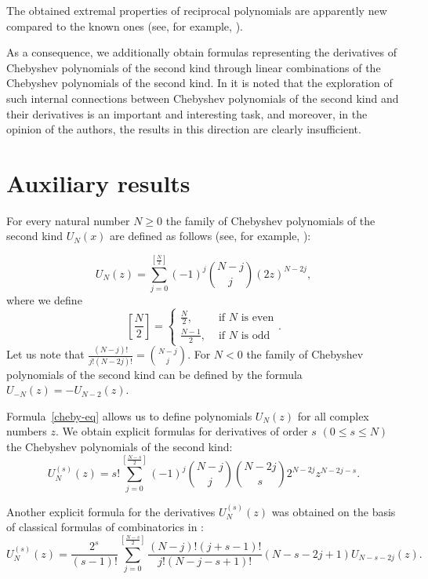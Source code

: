 \documentclass[12pt]{article}
\newcommand{\pa}[1]{\left(#1\right)}
\newcommand{\br}[1]{\left[#1\right]}
\begin{document}
The obtained extremal properties of reciprocal polynomials are apparently new compared to the known ones (see, for example, \cite{ref8,ref9,ref10}).

As a consequence, we additionally obtain formulas representing the derivatives of Chebyshev polynomials of the second kind through linear combinations of the Chebyshev polynomials of the second kind. In \cite{ref11,ref12,ref13} it is noted that the exploration of such internal connections between Chebyshev polynomials of the second kind and their derivatives is an important and interesting task, and moreover, in the opinion of the authors, the results in this direction are clearly insufficient.

\section{Auxiliary results}

For every natural number $N \geq 0$ the family of Chebyshev polynomials of the second kind $U_N(x)$ are defined as follows (see, for example, \cite{ref11}):

\begin{equation} \label{cheby-eq}
U_N(z) = \sum_{j = 0}^{\br{\frac{N}2}}(-1)^j{N-j\choose j}(2z)^{N-2j},
\end{equation}
where we define
\begin{displaymath}
\br{\frac{N}{2}} = \begin{cases}
\frac{N}{2}, & \mbox{ if } N \mbox{ is even} \\
\frac{N - 1}{2}, & \mbox{ if } N \mbox{ is odd}
\end{cases}.
\end{displaymath}
Let us note that $\frac{(N - j)!}{j!(N - 2j)!} = {N - j \choose j}$. For $N < 0$ the family of Chebyshev polynomials of the second kind can be defined by the formula $U_{-N}(z) = -U_{N - 2}(z)$.

Formula~\eqref{cheby-eq} allows us to define polynomials $U_N(z)$ for all complex numbers $z$. We obtain explicit formulas for derivatives of order $s$ $\pa{0 \leq s \leq N}$ the Chebyshev polynomials of the second kind:
\begin{equation}\label{cheby-der-eqn1}
U_N^{(s)}(z) = s!\sum_{j = 0}^{\br{\frac{N - s}{2}}}(-1)^j {N-j\choose j}{N-2j\choose s}2^{N - 2j}z^{N - 2j - s}.
\end{equation}

Another explicit formula for the derivatives $U_N^{(s)}(z)$ was obtained on the basis of classical formulas of combinatorics in \cite{ref12}:
\begin{equation}\label{cheby-der-eqn2}
U_N^{(s)}(z) = \frac{2^s}{(s - 1)!}\sum_{j = 0}^{\br{\frac{N - s}{2}}}\frac{(N - j)!(j + s - 1)!}{j!(N - j - s + 1)!}(N - s - 2j + 1)U_{N - s - 2j}(z).
\end{equation}
\end{document}

